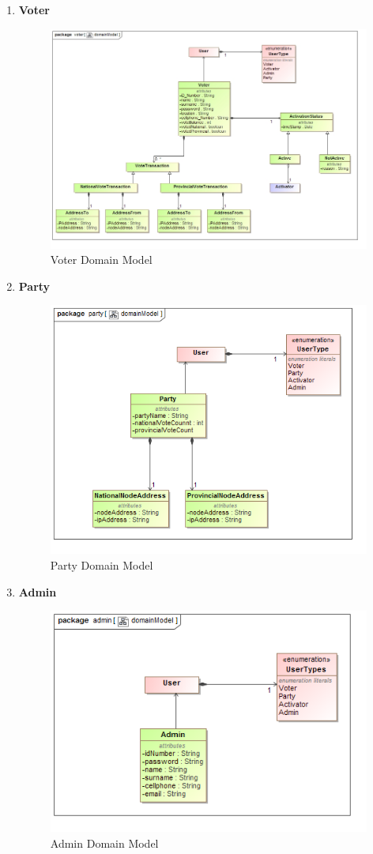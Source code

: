 \begin{enumerate}
		\item \textbf{Voter}
			\begin{figure}[H]
				\centering
				\includegraphics[width=0.75\linewidth]{../Images/DomainModels/voter_domainModel.png}
				\caption{Voter Domain Model}
			\end{figure}
			
			\newpage
			
			\item \textbf{Party}
			\begin{figure}[H]
				\centering
				\includegraphics[width=0.75\linewidth]{../Images/DomainModels/party_domainModel.png}
				\caption{Party Domain Model}
			\end{figure}
			
			\item \textbf{Admin}
			\begin{figure}[H]
				\centering
				\includegraphics[width=0.75\linewidth]{../Images/DomainModels/admin_domainModel.png}
				\caption{Admin Domain Model}
			\end{figure}
			

\end{enumerate}

